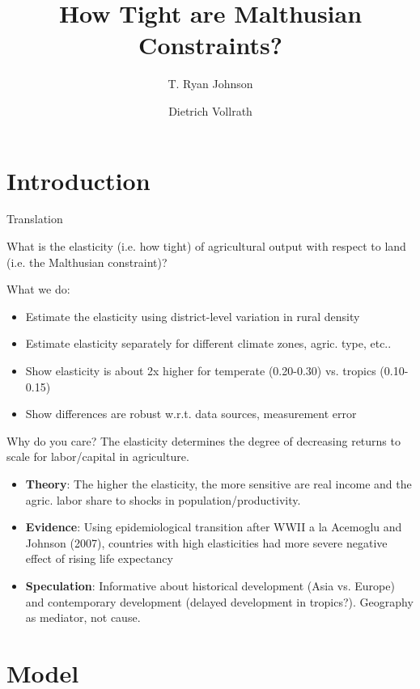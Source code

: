 \documentclass[10pt, xcolor=dvipsnames]{beamer}
\title[Land Constraints]{{How Tight are Malthusian Constraints?}}
\author[Johnson \& Vollrath]{T. Ryan Johnson \inst{1} \and Dietrich Vollrath \inst{2}}
\institute[UH]{\inst{1} University of Houston \and %
                      \inst{2} University of Houston}
\date[June 2017]{}
\begin{document}
\maketitle

\section{Introduction}

\begin{frame}{Translation}\label{define}

What is the elasticity (i.e. how tight) of agricultural output with respect to land (i.e. the Malthusian constraint)? 

What we do: 
\begin{itemize}
  \item Estimate the elasticity using district-level variation in rural density
  \item Estimate elasticity separately for different climate zones, agric. type, etc..
  \item Show elasticity is about 2x higher for temperate (0.20-0.30) vs. tropics (0.10-0.15)
  \item Show differences are robust w.r.t. data sources, measurement error
\end{itemize}


\end{frame}


\begin{frame}{Why do you care?}
The elasticity determines the degree of decreasing returns to scale for labor/capital in agriculture. 

\begin{itemize}
  \item \textbf{Theory}: The higher the elasticity, the more sensitive are real income and the agric. labor share to shocks in population/productivity.
  \item \textbf{Evidence}: Using epidemiological transition after WWII a la Acemoglu and Johnson (2007), countries with high elasticities had more severe negative effect of rising life expectancy
  \item \textbf{Speculation}: Informative about historical development (Asia vs. Europe) and contemporary development (delayed development in tropics?). Geography as mediator, not cause.
\end{itemize}

\end{frame}

\section{Model}
\end{document}
